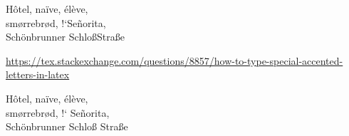 \documentclass{article}
\begin{document}

\noindent
H\^otel, na\"ive, \'el\`eve,\\
sm\o rrebr\o d, !`Se\~norita,\\
Sch\"onbrunner Schlo\ss Stra\ss e


\noindent
\href{https://tex.stackexchange.com/questions/8857/how-to-type-special-accented-letters-in-latex}{https://tex.stackexchange.com/questions/8857/how-to-type-special-accented-letters-in-latex}


\noindent
H\^ otel, na\" ive, \' el\` eve,\\
sm\o rrebr\o{}d, !` Se\~ norita,\\
Sch\" onbrunner Schlo\ss{} Stra\ss e
\end{document}
